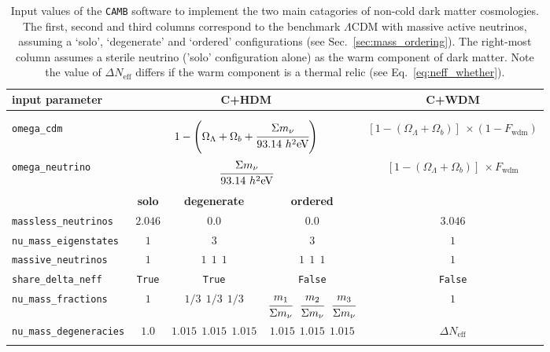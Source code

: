\begin{table}
	\begin{center}
	\begin{small}
		\begin{tabular}{lcccc}
			\textbf{input parameter} &  \multicolumn{3}{c}{\textbf{C+HDM}} & \textbf{C+WDM}\\[2pt]
			\hline \\[-10pt]
			\\[-10pt]
			\texttt{omega\_cdm} & \multicolumn{3}{c}{$1 - \left( \Omega_\Lambda + \Omega_b + \cfrac{\Sigma m_\nu}{93.14~h^2\mathrm{eV}} \right)$} & $\left[ 1 - (\Omega_\Lambda + \Omega_b) \right] ~ \times (1-F_{\mathrm{wdm}})$ \\[2pt]
			\texttt{omega\_neutrino} & \multicolumn{3}{c}{$\cfrac{\Sigma m_\nu}{93.14~h^2\mathrm{eV}}$} & $\left[ 1 - (\Omega_\Lambda + \Omega_b) \right] ~ \times F_{\mathrm{wdm}}$ \\[2pt]
			\\[-10pt]
			 & \textbf{solo} & \textbf{degenerate} & \textbf{ordered} & \\[2pt]
			\texttt{massless\_neutrinos} & $2.046$ & $0.0$ & $0.0$ & $3.046$ \\[2pt]
			\texttt{nu\_mass\_eigenstates} & $1$ & $3$ & $3$ & $1$ \\[2pt]
			\texttt{massive\_neutrinos} & $1$ & $1~~1~~1$ & $1~~1~~1$ & $1$ \\[2pt]
			\texttt{share\_delta\_neff} & \texttt{True} & \texttt{True} & \texttt{False} & \texttt{False} \\[2pt]
			\texttt{nu\_mass\_fractions} & $1$ & $1/3~~1/3~~1/3$ & $\cfrac{m_1}{\Sigma m_\nu}~~\cfrac{m_2}{\Sigma m_\nu}~~\cfrac{m_3}{\Sigma m_\nu}$ & $1$ \\[2pt]
			\texttt{nu\_mass\_degeneracies} & $1.0$ & $1.015~~1.015~~1.015$ & $1.015~~1.015~~1.015$ & $\Delta N_{\mathrm{eff}}$ \\[2pt]						
			\hline \\[-10pt]
		\end{tabular}
	\end{small}
	\end{center}
	\caption{Input values of the \texttt{CAMB} software to implement the two main catagories of non-cold dark matter cosmologies. The first, second and third columns correspond to the benchmark $\Lambda$CDM with massive active neutrinos, assuming a `solo', `degenerate' and `ordered' configurations (see Sec.~\ref{sec:mass_ordering}). The right-most column assumes a sterile neutrino ('solo' configuration alone) as the warm component of dark matter. Note the value of $\Delta N_{\mathrm{eff}}$ differs if the warm component is a thermal relic (see Eq.~\ref{eq:neff_whether}).}
	\label{tab:camb_param}
\end{table}

